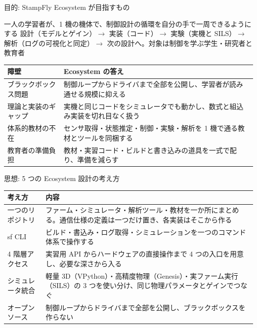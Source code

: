 \begin{frame}{目的: StampFly Ecosystem が目指すもの}
  \begin{block}{一人の学習者が、1 機の機体で、制御設計の循環を自分の手で一周できるようにする}
    \footnotesize 設計（モデルとゲイン）$\to$ 実装（コード）$\to$ 実験（実機と SILS）$\to$ 解析（ログの可視化と同定）$\to$ 次の設計へ。対象は制御を学ぶ学生・研究者と教育者
  \end{block}

  \begin{table}
    \centering\scriptsize
    \renewcommand{\arraystretch}{1.1}
    \begin{tabular}{lp{92mm}}
      \hline
      \textbf{障壁} & \textbf{Ecosystem の答え} \\
      \hline
      ブラックボックス問題 & 制御ループからドライバまで全部を公開し、学習者が読み通せる規模に抑える \\
      理論と実装のギャップ & 実機と同じコードをシミュレータでも動かし、数式と組込み実装を切れ目なく扱う \\
      体系的教材の不在 & センサ取得・状態推定・制御・実験・解析を 1 機で通る教材とツールを同梱する \\
      教育者の準備負担 & 教材・実習コード・ビルドと書き込みの道具を一式で配り、準備を減らす \\
      \hline
    \end{tabular}
  \end{table}
\end{frame}

\begin{frame}{思想: 5 つの Ecosystem 設計の考え方}
  \begin{table}
    \centering\footnotesize
    \renewcommand{\arraystretch}{1.2}
    \setlength{\tabcolsep}{8pt}
    \begin{tabular}{lp{104mm}}
      \hline
      \textbf{考え方} & \textbf{内容} \\
      \hline
      一つのリポジトリ & ファーム・シミュレータ・解析ツール・教材を一か所にまとめる。通信仕様の定義は一つだけ置き、各実装はそこから作る \\
      sf CLI & ビルド・書込み・ログ取得・シミュレーションを一つのコマンド体系で操作する \\
      4 階層アクセス & 実習用 API からハードウェアの直接操作まで 4 つの入口を用意し、必要な深さから入る \\
      シミュレータ統合 & 軽量 3D（VPython）・高精度物理（Genesis）・実ファーム実行（SILS）の 3 つを使い分け、同じ物理パラメータとゲインでつなぐ \\
      オープンソース & 制御ループからドライバまで全部を公開し、ブラックボックスを作らない \\
      \hline
    \end{tabular}
  \end{table}
\end{frame}

